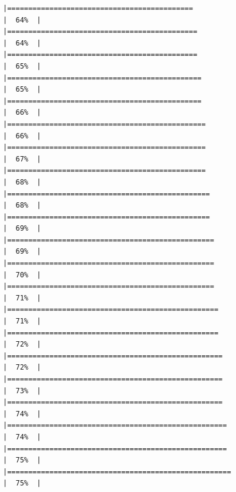 \documentclass[
]{article}
\begin{document}
\begin{verbatim}
|============================================                          |  64%  |                                                                              |=============================================                         |  64%  |                                                                              |=============================================                         |  65%  |                                                                              |==============================================                        |  65%  |                                                                              |==============================================                        |  66%  |                                                                              |===============================================                       |  66%  |                                                                              |===============================================                       |  67%  |                                                                              |===============================================                       |  68%  |                                                                              |================================================                      |  68%  |                                                                              |================================================                      |  69%  |                                                                              |=================================================                     |  69%  |                                                                              |=================================================                     |  70%  |                                                                              |=================================================                     |  71%  |                                                                              |==================================================                    |  71%  |                                                                              |==================================================                    |  72%  |                                                                              |===================================================                   |  72%  |                                                                              |===================================================                   |  73%  |                                                                              |===================================================                   |  74%  |                                                                              |====================================================                  |  74%  |                                                                              |====================================================                  |  75%  |                                                                              |=====================================================                 |  75%  |                                                                              
\end{verbatim}
\end{document}
